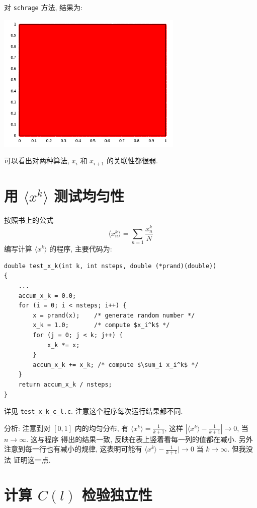 \documentclass{ctexart}
\begin{document}
\break 对 \verb|schrage| 方法, 结果为:
\begin{center}
\includegraphics[width=3.5in]{../schrage_1e6.png}\\
\end{center}

可以看出对两种算法, $x_i$ 和 $x_{i+1}$ 的关联性都很弱.

\section{用 $\langle x^k \rangle$ 测试均匀性}
按照书上的公式
\begin{equation}
\langle x_n^k \rangle = \sum_{n=1} \frac{x_n^k}{N}
\end{equation}
编写计算 $\langle x^k\rangle$ 的程序, 主要代码为:
\begin{verbatim}
double test_x_k(int k, int nsteps, double (*prand)(double))
{
    ...
    accum_x_k = 0.0;
    for (i = 0; i < nsteps; i++) {
        x = prand(x);    /* generate random number */
        x_k = 1.0;       /* compute $x_i^k$ */
        for (j = 0; j < k; j++) {
            x_k *= x;
        }
        accum_x_k += x_k; /* compute $\sum_i x_i^k$ */
    }
    return accum_x_k / nsteps;
}
\end{verbatim}
详见 \verb|test_x_k_c_l.c|. 注意这个程序每次运行结果都不同.



分析: 注意到对 $[0,1]$ 内的均匀分布, 有 $\langle x^k \rangle = \frac{1}{k+1}$,
这样 $|\langle x^k \rangle - \frac{1}{k+1}| \to 0$, 当 $n\to\infty$. 这与程序
得出的结果一致, 反映在表上竖着看每一列的值都在减小. 另外注意到每一行也有减小的规律,
这表明可能有 $\langle x^k\rangle - \frac{1}{k+1}|\to0$ 当 $k\to\infty$. 但我没法
证明这一点.

\section{计算 $C(l)$ 检验独立性}
\end{document}
